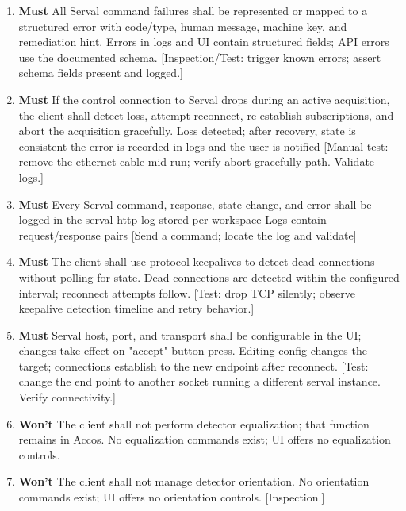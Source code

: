 \documentclass[10pt]{article}
\newcommand{\PriorityTag}[2]{%
  \colorbox{#2!25}{\footnotesize\textsf{\textbf{#1}}}\hspace{0.6em}}
\newcommand{\must}{\leavevmode\PriorityTag{Must}{green}}
\newcommand{\wont}{\leavevmode\PriorityTag{Won't}{red}}
\newcounter{reqgrp}[section] %
\newcounter{reqno}
\newcommand{\reqprefix}{GEN}
\newenvironment{requirements}[1]{%
  \renewcommand{\reqprefix}{#1}%
  \refstepcounter{reqgrp}%
  \setcounter{reqno}{0}%
  \begin{enumerate}[leftmargin=*]
}{\end{enumerate}}
\begin{document}
\begin{requirements}{SRV}
\item \must {}
  {All Serval command failures shall be represented or mapped to a structured error with code/type, human message, machine key, and remediation hint.}
  {Errors in logs and UI contain structured fields; API errors use the documented schema.}
  [Inspection/Test: trigger known errors; assert schema fields present and logged.]

\item \must {}
  {If the control connection to Serval drops during an active acquisition, the client shall detect loss, attempt reconnect, re-establish subscriptions, and abort the acquisition gracefully.}
  {Loss detected; after recovery, state is consistent the error is recorded in logs and the user is notified}
  [Manual test: remove the ethernet cable mid run; verify abort gracefully path. Validate logs.]

\item \must {}
  {Every Serval command, response, state change, and error shall be logged in the serval http log stored per workspace}
  {Logs contain request/response pairs}
  [Send a command; locate the log and validate]

\item \must {}
  {The client shall use protocol keepalives to detect dead connections without polling for state.}
  {Dead connections are detected within the configured interval; reconnect attempts follow.}
  [Test: drop TCP silently; observe keepalive detection timeline and retry behavior.]

\item \must {}
  {Serval host, port, and transport shall be configurable in the UI; changes take effect on "accept" button press.}
  {Editing config changes the target; connections establish to the new endpoint after reconnect.}
  [Test: change the end point to another socket running a different serval instance. Verify connectivity.]

\item \wont {}
  {The client shall not perform detector equalization; that function remains in Accos.}
  {No equalization commands exist; UI offers no equalization controls.}

\item \wont {}
  {The client shall not manage detector orientation.}
  {No orientation commands exist; UI offers no orientation controls.}
  [Inspection.]

\end{requirements}
\end{document}
